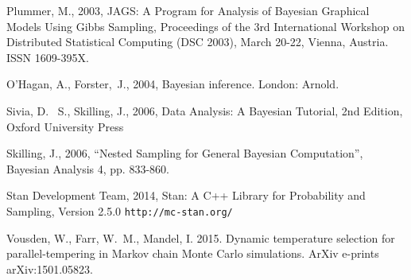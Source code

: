 \begin{thebibliography}{999}
Plummer, M., 2003, JAGS: A Program for Analysis of Bayesian Graphical Models
Using Gibbs Sampling, Proceedings of the 3rd International Workshop on
Distributed Statistical Computing (DSC 2003), March 20-22, Vienna, Austria.
ISSN 1609-395X.

O'Hagan, A., Forster,~J., 2004, Bayesian inference. London: Arnold.

 Sivia, 
D.~ S., Skilling, J., 2006, Data Analysis: A Bayesian Tutorial, 2nd 
Edition, Oxford University Press

 Skilling, 
J., 2006, ``Nested Sampling for General Bayesian Computation'', Bayesian 
Analysis 4, pp. 833-860.

 Stan Development Team, 2014,
Stan: A C++ Library for Probability and Sampling, Version 2.5.0
{\tt http://mc-stan.org/}

 Vousden, W., Farr, 
W.~M., Mandel, I. 2015. Dynamic temperature selection for 
parallel-tempering in Markov chain Monte Carlo simulations. ArXiv e-prints 
arXiv:1501.05823. 

\end{thebibliography}



%

